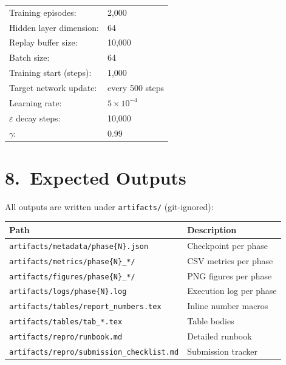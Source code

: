 \documentclass[letterpaper, 11pt]{article}
\begin{document}
\begin{tabular}{ll}
Training episodes:          & 2{,}000 \\
Hidden layer dimension:     & 64 \\
Replay buffer size:         & 10{,}000 \\
Batch size:                 & 64 \\
Training start (steps):     & 1{,}000 \\
Target network update:      & every 500 steps \\
Learning rate:              & $5 \times 10^{-4}$ \\
$\varepsilon$ decay steps:  & 10{,}000 \\
$\gamma$:                   & 0.99 \\
\end{tabular}

\section*{8.\ Expected Outputs}

All outputs are written under \texttt{artifacts/} (git-ignored):

\begin{center}
\begin{tabular}{ll}
\toprule
\textbf{Path} & \textbf{Description} \\
\midrule
\texttt{artifacts/metadata/phase\{N\}.json} & Checkpoint per phase \\
\texttt{artifacts/metrics/phase\{N\}\_*/}   & CSV metrics per phase \\
\texttt{artifacts/figures/phase\{N\}\_*/}   & PNG figures per phase \\
\texttt{artifacts/logs/phase\{N\}.log}      & Execution log per phase \\
\texttt{artifacts/tables/report\_numbers.tex} & Inline number macros \\
\texttt{artifacts/tables/tab\_*.tex}          & Table bodies \\
\texttt{artifacts/repro/runbook.md}           & Detailed runbook \\
\texttt{artifacts/repro/submission\_checklist.md} & Submission tracker \\
\bottomrule
\end{tabular}
\end{center}
\end{document}

